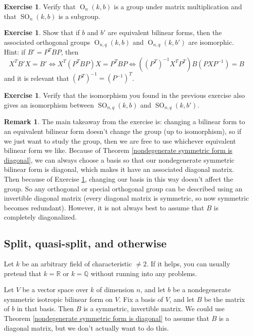 \documentclass[12pt]{article}
\theoremstyle{definition}
\newtheorem{remark}[theorem]{Remark}
\newtheorem{exercise}[theorem]{Exercise}
\newcommand{\Q}{\mathbb{Q}}
\newcommand{\R}{\mathbb{R}}
\newcommand{\lp}{\left(}
\newcommand{\rp}{\right)}
\newcommand{\inv}{^{-1}}
\DeclareMathOperator{\OO}{O}
\DeclareMathOperator{\SO}{SO}
\begin{document}
\begin{exercise}
Verify that $\OO_{n}(k,b)$ is a group under matrix multiplication and that $\SO_{n}(k,b)$ is a subgroup.
\end{exercise}

\begin{exercise}
\label{equivalent forms give isomorphic groups}
Show that if $b$ and $b'$ are equivalent bilinear forms, then the associated orthogonal groups $\OO_{n,q}(k,b)$ and $\OO_{n,q}(k,b')$ are isomorphic. Hint: if $B' = P^T B P$, then
\[
	X^T B' X = B' \iff X^T \lp P^T BP \rp X = P^T BP \iff \lp (P^T) \inv X^T P^T \rp B \lp P X P \inv \rp = B
\]
and it is relevant that $(P^T) \inv = (P \inv)^T$.
\end{exercise}

\begin{exercise}
Verify that the isomorphism you found in the previous exercise also gives an isomorphism between $\SO_{n,q}(k,b)$ and $\SO_{n,q}(k,b')$.
\end{exercise}

\begin{remark}
The main takeaway from the exercise is: changing a bilinear form to an equivalent bilinear form doesn't change the group (up to isomorphism), so if we just want to study the group, then we are free to use whichever equivalent bilinear form we like. Because of Theorem \ref{nondegenerate symmetric form is diagonal}, we can always choose a basis so that our nondegenerate symmetric bilinear form is diagonal, which makes it have an associated diagonal matrix. Then because of Exercise \ref{equivalent forms give isomorphic groups}, changing our basis in this way doesn't affect the group. So any orthogonal or special orthogonal group can be described using an invertible diagonal matrix (every diagonal matrix is symmetric, so now symmetric becomes redundant). However, it is not always best to assume that $B$ is completely diagonalized.
\end{remark}

\subsection{Split, quasi-split, and otherwise}

Let $k$ be an arbitrary field of characteristic $\neq 2$. If it helps, you can usually pretend that $k = \R$ or $k = \Q$ without running into any problems. 

Let $V$ be a vector space over $k$ of dimension $n$, and let $b$ be a nondegenerate symmetric isotropic bilinear form on $V$. Fix a basis of $V$, and let $B$ be the matrix of $b$ in that basis. Then $B$ is a symmetric, invertible matrix. We could use Theorem \ref{nondegenerate symmetric form is diagonal} to assume that $B$ is a diagonal matrix, but we don't actually want to do this.
\end{document}
